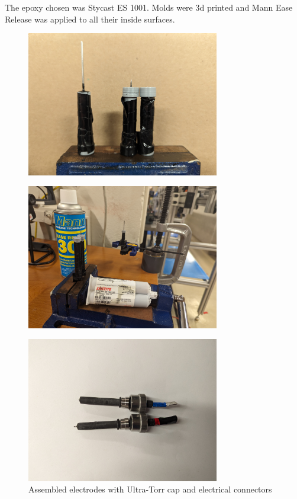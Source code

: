                 The epoxy chosen was Stycast ES 1001. Molds were 3d printed and Mann Ease Release was applied to all their inside surfaces.

                \begin{figure}[h]
                    \centering
                    \includegraphics[width=0.75\textwidth]{assets/3 design/Molds.jpg}
                \end{figure}

                \begin{figure}[h]
                    \centering
                    \includegraphics[width=0.75\textwidth]{assets/3 design/Mold process.jpg}
                \end{figure}


                \begin{figure}[h]
                    \centering
                    \includegraphics[width=0.75\textwidth]{assets/3 design/V2 electrodes.jpg}
                    \caption{Assembled electrodes with Ultra-Torr cap and electrical connectors}
                \end{figure}
